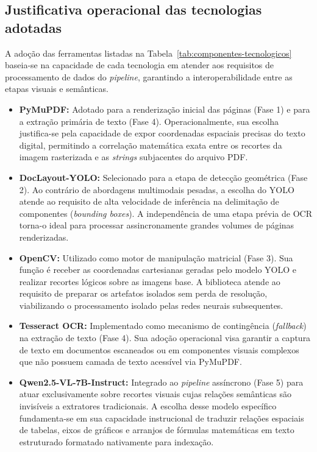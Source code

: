 \subsection{Justificativa operacional das tecnologias adotadas}

A adoção das ferramentas listadas na Tabela~\ref{tab:componentes-tecnologicos} baseia-se na capacidade de cada tecnologia em atender aos requisitos de processamento de dados do \textit{pipeline}, garantindo a interoperabilidade entre as etapas visuais e semânticas.

\begin{itemize}

    \item \textbf{PyMuPDF:} Adotado para a renderização inicial das páginas (Fase 1) e para a extração primária de texto (Fase 4). Operacionalmente, sua escolha justifica-se pela capacidade de expor coordenadas espaciais precisas do texto digital, permitindo a correlação matemática exata entre os recortes da imagem rasterizada e as \textit{strings} subjacentes do arquivo PDF.

    \item \textbf{DocLayout-YOLO:} Selecionado para a etapa de detecção geométrica (Fase 2). Ao contrário de abordagens multimodais pesadas, a escolha do YOLO atende ao requisito de alta velocidade de inferência na delimitação de componentes (\textit{bounding boxes}). A independência de uma etapa prévia de OCR torna-o ideal para processar assincronamente grandes volumes de páginas renderizadas.

    \item \textbf{OpenCV:} Utilizado como motor de manipulação matricial (Fase 3). Sua função é receber as coordenadas cartesianas geradas pelo modelo YOLO e realizar recortes lógicos sobre as imagens base. A biblioteca atende ao requisito de preparar os artefatos isolados sem perda de resolução, viabilizando o processamento isolado pelas redes neurais subsequentes.

    \item \textbf{Tesseract OCR:} Implementado como mecanismo de contingência (\textit{fallback}) na extração de texto (Fase 4). Sua adoção operacional visa garantir a captura de texto em documentos escaneados ou em componentes visuais complexos que não possuem camada de texto acessível via PyMuPDF.
    
    \item \textbf{Qwen2.5-VL-7B-Instruct:} Integrado ao \textit{pipeline} assíncrono (Fase 5) para atuar exclusivamente sobre recortes visuais cujas relações semânticas são invisíveis a extratores tradicionais. A escolha desse modelo específico fundamenta-se em sua capacidade instrucional de traduzir relações espaciais de tabelas, eixos de gráficos e arranjos de fórmulas matemáticas em texto estruturado formatado nativamente para indexação.


\end{itemize}
